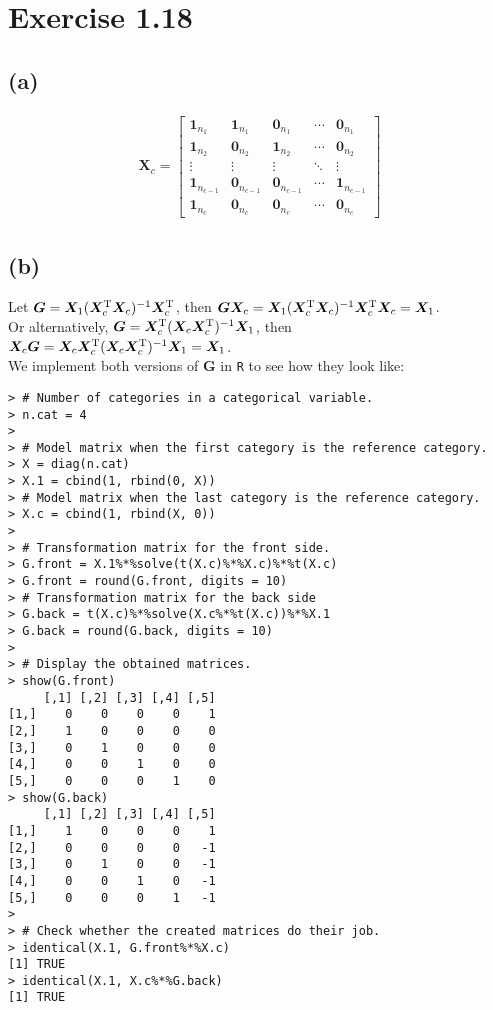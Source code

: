 \documentclass[a4paper]{article}
\begin{document}
\section{Exercise 1.18}

\subsection{(a)}
\begin{align*}
\bm{X}_{c} = 
\begin{bmatrix}
\bm{1}_{n_{1}} & \bm{1}_{n_{1}} & \bm{0}_{n_{1}} & \cdots & \bm{0}_{n_{1}}\\
\bm{1}_{n_{2}} & \bm{0}_{n_{2}} & \bm{1}_{n_{2}} & \cdots & \bm{0}_{n_{2}}\\
\vdots & \vdots & \vdots & \ddots & \vdots\\
\bm{1}_{n_{c-1}} & \bm{0}_{n_{c-1}} & \bm{0}_{n_{c-1}} & \cdots & \bm{1}_{n_{c-1}}\\
\bm{1}_{n_{c}} & \bm{0}_{n_{c}} & \bm{0}_{n_{c}} & \cdots & \bm{0}_{n_{c}}
\end{bmatrix}
\end{align*}


\subsection{(b)}


Let $\bm{G} = \bm{X}_{1}(\bm{X}_{c}^{\rm T}\bm{X}_{c})^{-1}\bm{X}_{c}^{\rm T}$, then $\bm{G}\bm{X}_{c} = \bm{X}_{1}(\bm{X}_{c}^{\rm T}\bm{X}_{c})^{-1}\bm{X}_{c}^{\rm T}\bm{X}_{c} = \bm{X}_{1}$.\\
Or alternatively, $\bm{G} = \bm{X}_{c}^{\rm T}(\bm{X}_{c}\bm{X}_{c}^{\rm T})^{-1}\bm{X}_{1}$, then $\bm{X}_{c}\bm{G} = \bm{X}_{c}\bm{X}_{c}^{\rm T}(\bm{X}_{c}\bm{X}_{c}^{\rm T})^{-1}\bm{X}_{1} = \bm{X}_{1}$.\\

We implement both versions of $\bm{G}$ in \texttt{R} to see how they look like:

\begin{lstlisting}
> # Number of categories in a categorical variable.
> n.cat = 4
> 
> # Model matrix when the first category is the reference category.
> X = diag(n.cat)
> X.1 = cbind(1, rbind(0, X))
> # Model matrix when the last category is the reference category.
> X.c = cbind(1, rbind(X, 0))
> 
> # Transformation matrix for the front side.
> G.front = X.1%*%solve(t(X.c)%*%X.c)%*%t(X.c)
> G.front = round(G.front, digits = 10)
> # Transformation matrix for the back side
> G.back = t(X.c)%*%solve(X.c%*%t(X.c))%*%X.1
> G.back = round(G.back, digits = 10)
> 
> # Display the obtained matrices.
> show(G.front)
     [,1] [,2] [,3] [,4] [,5]
[1,]    0    0    0    0    1
[2,]    1    0    0    0    0
[3,]    0    1    0    0    0
[4,]    0    0    1    0    0
[5,]    0    0    0    1    0
> show(G.back)
     [,1] [,2] [,3] [,4] [,5]
[1,]    1    0    0    0    1
[2,]    0    0    0    0   -1
[3,]    0    1    0    0   -1
[4,]    0    0    1    0   -1
[5,]    0    0    0    1   -1
> 
> # Check whether the created matrices do their job.
> identical(X.1, G.front%*%X.c)
[1] TRUE
> identical(X.1, X.c%*%G.back)
[1] TRUE
\end{lstlisting}
\end{document}
